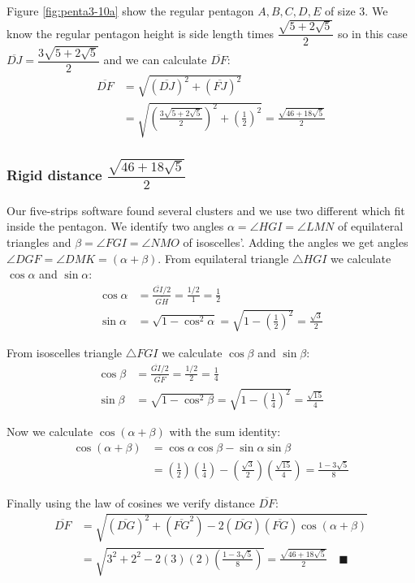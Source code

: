 \documentclass[11pt]{article}
\begin{document}
Figure \ref{fig:penta3-10a} show the regular pentagon $A,B,C,D,E$ of size $3$. We know the regular pentagon height is side length times $\dfrac{\sqrt{5+2\sqrt5}}2$ so in this case $\overline{DJ} = \dfrac{3\sqrt{5+2\sqrt5}}2$ and we can calculate $\overline{DF}$:
\begin{align}
\overline{DF} &= \sqrt{(\overline{DJ})^2 + (\overline{FJ})^2}\nonumber\\
 &= \sqrt{\left(\frac{3\sqrt{5+2\sqrt5}}2\right)^2 + \left(\frac{1}2\right)^2}
 = \frac{\sqrt{46+18\sqrt5}}2
\end{align}

\subsubsection{Rigid distance $\dfrac{\sqrt{46+18\sqrt5}}2$}

Our five-strips software found several clusters and we use two different which fit inside the pentagon. We identify two angles $\alpha = \angle{HGI} = \angle{LMN}$ of equilateral triangles and $\beta = \angle{FGI} = \angle{NMO}$ of isoscelles'. Adding the angles we get angles $\angle{DGF} = \angle{DMK} = (\alpha + \beta)$. From equilateral triangle $\triangle{HGI}$ we calculate $\cos\alpha$ and $\sin\alpha$:
\begin{align}
\cos\alpha &= \frac{\overline{GI} / 2}{\overline{GH}} = \frac{1 / 2}1 = \frac{1}2\\
\sin\alpha &= \sqrt{1 - \cos^2\alpha} = \sqrt{1 - \left(\frac{1}2\right)^2} = \frac{\sqrt3}2
\end{align}

From isoscelles triangle $\triangle{FGI}$ we calculate $\cos\beta$ and $\sin\beta$:
\begin{align}
\cos\beta &= \frac{\overline{GI} / 2}{\overline{GF}} = \frac{1 / 2}2 = \frac{1}4\\
\sin\beta &= \sqrt{1 - \cos^2\beta} = \sqrt{1 - \left(\frac{1}4\right)^2} = \frac{\sqrt{15}}4
\end{align}

Now we calculate $\cos(\alpha+\beta)$ with the sum identity:
\begin{align}
\cos(\alpha+\beta) &= \cos\alpha\cos\beta - \sin\alpha\sin\beta \nonumber\\
 &= \left(\frac{1}2\right)\left(\frac{1}4\right)
  -\left(\frac{\sqrt3}2\right)\left(\frac{\sqrt{15}}4\right)
 = \frac{1 - 3\sqrt5}8
\end{align}

Finally using the law of cosines we verify distance $\overline{DF}$:
\begin{align}
\overline{DF} &= \sqrt{(\overline{DG})^2 + (\overline{FG}^2)
 - 2(\overline{DG})(\overline{FG})\cos(\alpha+\beta)} \nonumber\\
 &= \sqrt{3^2 + 2^2 - 2(3)(2)\left(\frac{1 - 3\sqrt5}8\right)}
 = \frac{\sqrt{46+18\sqrt5}}2 \quad\blacksquare
\end{align}
\end{document}
